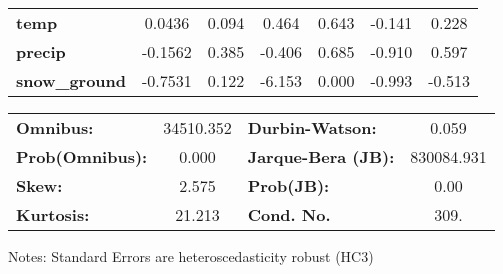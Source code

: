 \begin{center}
\begin{tabular}{lcccccc}
\textbf{temp}          &       0.0436  &        0.094     &     0.464  &         0.643        &       -0.141    &        0.228     \\
\textbf{precip}        &      -0.1562  &        0.385     &    -0.406  &         0.685        &       -0.910    &        0.597     \\
\textbf{snow\_ground}  &      -0.7531  &        0.122     &    -6.153  &         0.000        &       -0.993    &       -0.513     \\
\bottomrule
\end{tabular}
\begin{tabular}{lclc}
\textbf{Omnibus:}       & 34510.352 & \textbf{  Durbin-Watson:     } &     0.059   \\
\textbf{Prob(Omnibus):} &    0.000  & \textbf{  Jarque-Bera (JB):  } & 830084.931  \\
\textbf{Skew:}          &    2.575  & \textbf{  Prob(JB):          } &      0.00   \\
\textbf{Kurtosis:}      &   21.213  & \textbf{  Cond. No.          } &      309.   \\
\bottomrule
\end{tabular}
\end{center}

Notes: \newline
 [1] Standard Errors are heteroscedasticity robust (HC3)